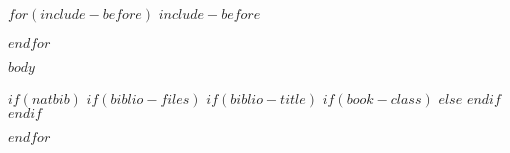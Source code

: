 \documentclass[$for(classoption)$$classoption$$sep$,$endfor$,twoside,openright]{book}
\begin{document}
$for(include-before)$
$include-before$

$endfor$

$body$

$if(natbib)$
$if(biblio-files)$
$if(biblio-title)$
$if(book-class)$
\renewcommand\bibname{$biblio-title$}
$else$
\renewcommand\refname{$biblio-title$}
$endif$
$endif$

$endfor$
\end{document}
